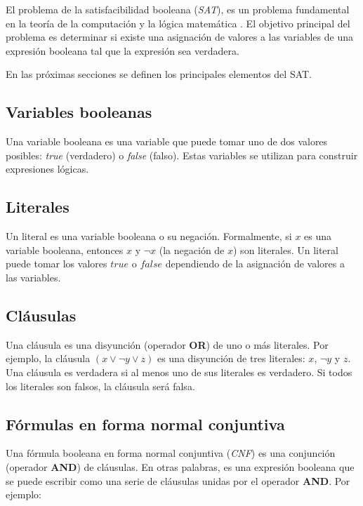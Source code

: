 El problema de la satisfacibilidad booleana (\textit{SAT}), es un problema fundamental en la teoría de la 
computación y la lógica matemática \cite{authomataTheory}. El objetivo principal del problema es determinar si existe una asignación de valores a las variables de una expresión booleana tal que la expresión sea verdadera.

En las próximas secciones se definen los principales elementos del SAT.
\subsection{Variables booleanas}

Una variable booleana es una variable que puede tomar uno de dos valores posibles: \textit{true} (verdadero) o \textit{false} (falso). Estas variables se utilizan para construir expresiones lógicas.

\subsection{Literales}

Un literal es una variable booleana o su negación. Formalmente, si \( x \) es una variable booleana, entonces \( x \) y \( \neg x \) (la negación de \( x \)) son literales. Un literal puede tomar los valores \( true \) o \( false \) dependiendo de la asignación de valores a las variables.

\subsection{Cláusulas}

Una cláusula es una disyunción (operador \textbf{OR}) de uno o más literales. Por ejemplo, la cláusula \( (x \vee \neg y \vee z) \) es una disyunción de tres literales: \( x \), \( \neg y \) y \( z \). Una cláusula es verdadera si al menos uno de sus literales es verdadero. Si todos los literales son falsos, la cláusula será falsa.

\subsection{Fórmulas en forma normal conjuntiva}

Una fórmula booleana en forma normal conjuntiva (\textit{CNF}) es una conjunción (operador \textbf{AND}) de cláusulas. En otras palabras, es una expresión booleana que se puede escribir como una serie de cláusulas unidas por el operador \textbf{AND}. Por ejemplo:

